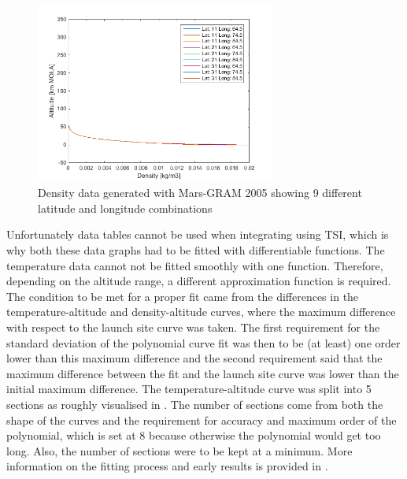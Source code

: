\begin{figure}[H]
\centering
\includegraphics[width=0.7\textwidth]{figures/software/densityData.png}
\caption{Density data generated with Mars-\ac{GRAM} 2005 showing 9 different latitude and longitude combinations}
\label{fig:densityData}
\end{figure}

\noindent
Unfortunately data tables cannot be used when integrating using \ac{TSI}, which is why both these data graphs had to be fitted with differentiable functions. The temperature data cannot not be fitted smoothly with one function.  Therefore, depending on the altitude range, a different approximation function is required. The condition to be met for a proper fit came from the differences in the temperature-altitude and density-altitude curves, where the maximum difference with respect to the launch site curve was taken. The first requirement for the standard deviation of the polynomial curve fit was then to be (at least) one order lower than this maximum difference and the second requirement said that the maximum difference between the fit and the launch site curve was lower than the initial maximum difference. The temperature-altitude curve was split into 5 sections as roughly visualised in . The number of sections come from both the shape of the curves and the requirement for accuracy and maximum order of the polynomial, which is set at 8 because otherwise the polynomial would get too long. Also, the number of sections were to be kept at a minimum. More information on the fitting process and early results is provided in .


